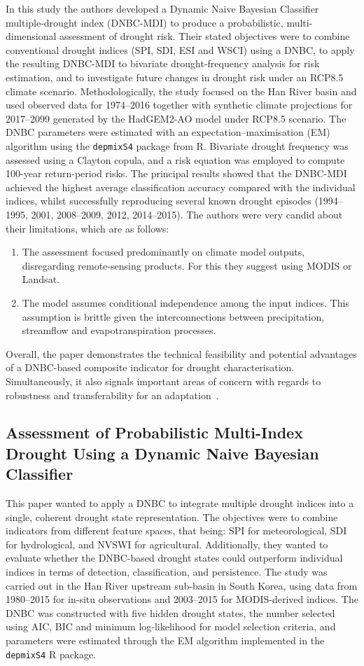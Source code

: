 In this study the authors developed a Dynamic Naive Bayesian Classifier multiple-drought index (DNBC-MDI) to produce a probabilistic, multi-dimensional assessment of drought risk. Their stated objectives were to combine conventional drought indices (SPI, SDI, ESI and WSCI) using a DNBC, to apply the resulting DNBC-MDI to bivariate drought-frequency analysis for risk estimation, and to investigate future changes in drought risk under an RCP8.5 climate scenario. Methodologically, the study focused on the Han River basin and used observed data for 1974–2016 together with synthetic climate projections for 2017–2099 generated by the HadGEM2-AO model under RCP8.5 scenario. The DNBC parameters were estimated with an expectation–maximisation (EM) algorithm using the \texttt{depmixS4} package from R. Bivariate drought frequency was assessed using a Clayton copula, and a risk equation was employed to compute 100-year return-period risks. The principal results showed that the DNBC-MDI achieved the highest average classification accuracy compared with the individual indices, whilst successfully reproducing several known drought episodes (1994–1995, 2001, 2008–2009, 2012, 2014–2015). The authors were very candid about their limitations, which are as follows: 
\begin{enumerate}
    \item The assessment focused predominantly on climate model outputs, disregarding remote-sensing products. For this they suggest using MODIS or Landsat.
    \item The model assumes conditional independence among the input indices. This assumption is brittle given the interconnections between precipitation, streamflow and evapotranspiration processes. 
\end{enumerate}
Overall, the paper demonstrates the technical feasibility and potential advantages of a DNBC-based composite indicator for drought characterisation. Simultaneously, it also signals important areas of concern with regards to robustness and transferability for an adaptation~\cite{dnbc_drought_second}.

\subsection*{Assessment of Probabilistic Multi-Index Drought Using a Dynamic Naive Bayesian Classifier}

This paper wanted to apply a DNBC to integrate multiple drought indices into a single, coherent drought state representation. The objectives were to combine indicators from different feature spaces, that being: SPI for meteorological, SDI for hydrological, and NVSWI for agricultural. Additionally, they wanted to evaluate whether the DNBC-based drought states could outperform individual indices in terms of detection, classification, and persistence. The study was carried out in the Han River upstream sub-basin in South Korea, using data from 1980–2015 for in-situ observations and 2003–2015 for MODIS-derived indices. The DNBC was constructed with five hidden drought states, the number selected using AIC, BIC and minimum log-likelihood for model selection criteria, and parameters were estimated through the EM algorithm implemented in the \texttt{depmixS4} R package.

